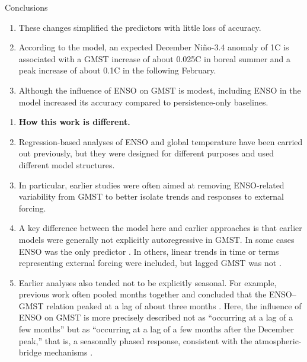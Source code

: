 \documentclass[aspectratio=169,xcolor=dvipsnames]{beamer}
\begin{document}
\begin{frame}[allowframebreaks]{Conclusions}
\begin{enumerate}
  \item These changes simplified the predictors with little loss of
    accuracy.
    
  \item According to the model, an expected December Ni\~no-3.4
    anomaly of 1\textdegree C is associated with a GMST increase of
    about 0.025\textdegree C in boreal summer and a peak increase of
    about 0.1\textdegree C in the following February.

  \item Although the influence of ENSO on GMST is modest, including
    ENSO in the model increased its accuracy compared to
    persistence-only baselines.
  

\end{enumerate}

\begin{enumerate}\fontsize{6pt}{8pt}\selectfont
\item \textbf{How this work is different.}

\item Regression-based analyses of ENSO and global temperature have
  been carried out previously, but they were designed for different
  purposes and used different model structures.

\item In particular, earlier studies were often aimed at removing
  ENSO-related variability from GMST to better isolate trends and
  responses to external forcing.

\item A key difference between the model here and earlier approaches
  is that earlier models were generally not explicitly autoregressive
  in GMST. In some cases ENSO was the only predictor
  \citep{Angell2000tropospheric,Trenberth2002evolution}.  In others,
  linear trends in time or terms representing external forcing were
  included, but lagged GMST was not
  \citep{Foster2011global,Lean2008natural}.

\item Earlier analyses also tended not to be explicitly seasonal.  For
  example, previous work often pooled months together and concluded
  that the ENSO--GMST relation peaked at a lag of about three months
  \citep{Trenberth2002evolution}. Here, the influence of ENSO on GMST
  is more precisely described not as ``occurring at a lag of a few
  months'' but as ``occurring at a lag of a few months after the
  December peak,'' that is, a seasonally phased response, consistent
  with the atmospheric-bridge mechanisms
  \citep{Alexander2002atmospheric,Klein1999remote}.


\end{enumerate}
\end{frame}
\end{document}
